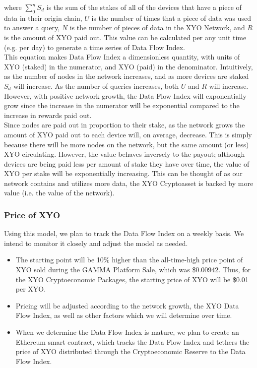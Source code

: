 \documentclass{article}
\begin{document}
where $\sum^{n}_{0}{S_d}$ is the sum of the stakes of all of the devices that have a piece of data in their origin chain, $U$ is the number of times that a piece of data was used to answer a query, $N$ is the number of pieces of data in the XYO Network, and $R$ is the amount of XYO paid out. This value can be calculated per any unit time (e.g. per day) to generate a time series of Data Flow Index. \\
This equation makes Data Flow Index a dimensionless quantity, with units of XYO (staked) in the numerator, and XYO (paid) in the denominator. Intuitively, as the number of nodes in the network increases, and as more devices are staked $S_d$ will increase. As the number of queries increases, both $U$ and $R$ will increase. However, with positive network growth, the Data Flow Index will exponentially grow since the increase in the numerator will be exponential compared to the increase in rewards paid out.\\
Since nodes are paid out in proportion to their stake, as the network grows the amount of XYO paid out to each device will, on average, decrease. This is simply because there will be more nodes on the network, but the same amount (or less) XYO circulating. However, the value behaves inversely to the payout; although devices are being paid less per amount of stake they have over time, the value of XYO per stake will be exponentially increasing. This can be thought of as our network contains and utilizes more data, the XYO Cryptoasset is backed by more value (i.e. the value of the network).

\subsubsection{Price of XYO}

Using this model, we plan to track the Data Flow Index on a weekly basis. We intend to monitor it closely and adjust the model as needed.

\begin{itemize}
  \item The starting point will be 10\% higher than the all-time-high price point of XYO sold during the GAMMA Platform Sale, which was \$0.00942. Thus, for the XYO Cryptoeconomic Packages, the starting price of XYO will be \$0.01 per XYO.
  \item Pricing will be adjusted according to the network growth, the XYO Data Flow Index, as well as other factors which we will determine over time.
  \item When we determine the Data Flow Index is mature, we plan to create an Ethereum smart contract, which tracks the Data Flow Index and tethers the price of XYO distributed through the Cryptoeconomic Reserve to the Data Flow Index.
\end{itemize}
\end{document}
